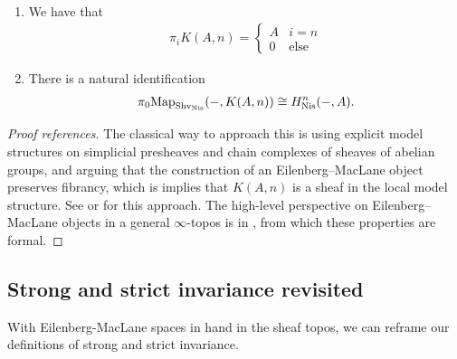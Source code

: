 \documentclass[11pt,openany]{book}
\begin{document}
\begin{proposition}[Properties of $K(A,n)$] \,
\begin{enumerate}
    \item We have that
    \begin{align*}
        \pi_i K(A,n) = \begin{cases} A & i=n \\ 0 & \text{else} \end{cases}
    \end{align*}
\item There is a natural identification
\begin{align*}
    \pi_0 \mathrm{Map}_{\mathrm{Shv}_{\mathrm{Nis}}}(-,K(A,n)) \cong H^n_{\mathrm{Nis}}(-,A).
\end{align*}
\end{enumerate}
\end{proposition}
\begin{proof}[Proof references] The classical way to approach this is using explicit model structures on simplicial presheaves and chain complexes of sheaves of abelian groups, and arguing that the construction of an Eilenberg--MacLane object preserves fibrancy, which is implies that $K(A,n)$ is a sheaf in the local model structure.  See \cite[Chapter~6]{Morel} or \cite[pp.56---59]{MV} for this approach. The high-level perspective on Eilenberg--MacLane objects in a general $\infty$-topos is in \cite[\S7.2.2]{HTT}, from which these properties are formal.
\end{proof}



\subsection{Strong and strict invariance revisited}

With Eilenberg-MacLane spaces in hand in the sheaf topos, we can reframe our definitions of strong and strict invariance.
\end{document}
